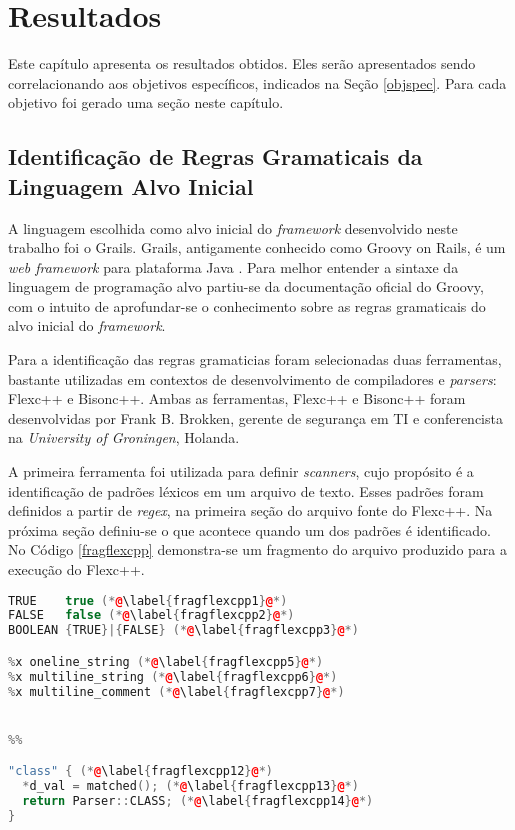 \chapter[Resultados]{Resultados}
Este capítulo apresenta os resultados obtidos. Eles serão apresentados sendo
correlacionando aos objetivos específicos, indicados na Seção \ref{objspec}.
Para cada objetivo foi gerado uma seção neste capítulo.

\section{Identificação de Regras Gramaticais da Linguagem Alvo Inicial}
A linguagem escolhida como alvo inicial do \textit{framework} desenvolvido
neste trabalho foi o \textsf{Grails}. \textsf{Grails}, antigamente conhecido
como \textsf{Groovy on Rails}, é um \textit{web framework} para plataforma Java
\cite{grails2015}. Para melhor entender a sintaxe da linguagem de programação
alvo partiu-se da documentação oficial do \textsf{Groovy}, com o intuito de
aprofundar-se o conhecimento sobre as regras gramaticais do alvo inicial do
\textit{framework}.

Para a identificação das regras gramaticias foram selecionadas duas ferramentas,
bastante utilizadas em contextos de desenvolvimento de compiladores e
\textit{parsers}: \textsf{Flexc++} e \textsf{Bisonc++}. Ambas as ferramentas, \textsf{Flexc++} e \textsf{Bisonc++} foram desenvolvidas por Frank B. Brokken, gerente de segurança em TI e conferencista na \textit{University of Groningen}, Holanda.

A primeira ferramenta foi utilizada para definir \textit{scanners}, cujo propósito é a identificação de padrões léxicos em um arquivo de texto. Esses padrões foram definidos a partir de \textit{regex}, na primeira seção do arquivo fonte do Flexc++. Na próxima seção definiu-se o que acontece quando um dos padrões é identificado. No Código \ref{fragflexcpp} demonstra-se um fragmento do arquivo produzido para a execução do \textsf{Flexc++}.

\begin{lstlisting}[language=C++, label=fragflexcpp, caption=Fragmento do código fonte para o \flexcpp]
TRUE    true (*@\label{fragflexcpp1}@*)
FALSE   false (*@\label{fragflexcpp2}@*)
BOOLEAN {TRUE}|{FALSE} (*@\label{fragflexcpp3}@*)

%x oneline_string (*@\label{fragflexcpp5}@*)
%x multiline_string (*@\label{fragflexcpp6}@*)
%x multiline_comment (*@\label{fragflexcpp7}@*)


%%

"class" { (*@\label{fragflexcpp12}@*)
  *d_val = matched(); (*@\label{fragflexcpp13}@*)
  return Parser::CLASS; (*@\label{fragflexcpp14}@*)
}
\end{lstlisting}

